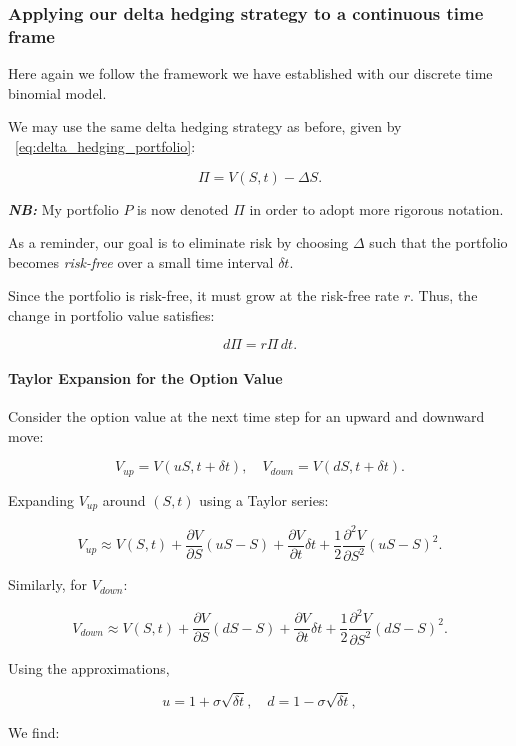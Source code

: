 \documentclass{article}
\begin{document}
\subsubsection{Applying our delta hedging strategy to a continuous time frame}
\label{sec:deriving_continuous}

Here again we follow the framework we have established with our discrete time binomial model.

We may use the same delta hedging strategy as before, given by ~\ref{eq:delta_hedging_portfolio}:

\[
    \Pi = V(S, t) - \Delta S.
\]

\noindent\textbf{\textit{NB:}} My portfolio $P$ is now denoted $\Pi$ in order to adopt more rigorous notation.


As a reminder, our goal is to eliminate risk by choosing \( \Delta \) such that the portfolio becomes \emph{risk-free} over a small time interval \( \delta t \).

Since the portfolio is risk-free, it must grow at the risk-free rate \( r \). Thus, the change in portfolio value satisfies:

\[
    d\Pi = r \Pi \, dt.
\]


\paragraph{Taylor Expansion for the Option Value}
\label{paragraph:taylor_expansion_option_value}

Consider the option value at the next time step for an upward and downward move:

\[
    V_{up} = V(uS, t + \delta t), \quad V_{down} = V(dS, t + \delta t).
\]

Expanding \( V_{up} \) around \( (S, t) \) using a Taylor series:

\[
    V_{up} \approx V(S, t) + \frac{\partial V}{\partial S}(uS - S) + \frac{\partial V}{\partial t} \delta t + \frac{1}{2} \frac{\partial^2 V}{\partial S^2} (uS - S)^2.
\]

Similarly, for \( V_{down} \):

\[
    V_{down} \approx V(S, t) + \frac{\partial V}{\partial S}(dS - S) + \frac{\partial V}{\partial t} \delta t + \frac{1}{2} \frac{\partial^2 V}{\partial S^2} (dS - S)^2.
\]

Using the approximations,

\[
    u = 1 + \sigma \sqrt{\delta t}, \quad d = 1 - \sigma \sqrt{\delta t},
\]

We find:
\end{document}
